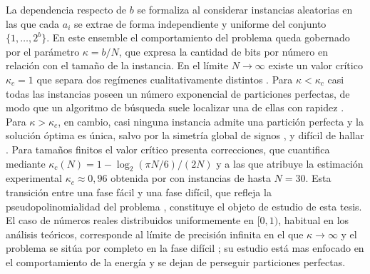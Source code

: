 La dependencia respecto de $b$ se formaliza al considerar instancias aleatorias en las que cada $a_i$ se extrae de forma independiente y uniforme del conjunto $\{1, \ldots, 2^{b}\}$. En este ensemble el comportamiento del problema queda gobernado por el parámetro $\kappa = b/N$, que expresa la cantidad de bits por número en relación con el tamaño de la instancia. En el límite $N \to \infty$ existe un valor crítico $\kappa_c = 1$ que separa dos regímenes cualitativamente distintos \parencite{mertens1998,mertens2001,borgs2001}. Para $\kappa < \kappa_c$ casi todas las instancias poseen un número exponencial de particiones perfectas, de modo que un algoritmo de búsqueda suele localizar una de ellas con rapidez \parencite{mertens1998,mertens2001}. Para $\kappa > \kappa_c$, en cambio, casi ninguna instancia admite una partición perfecta y la solución óptima es única, salvo por la simetría global de signos \parencite{borgs2001}, y difícil de hallar \parencite{mertens1998,mertens2001}. Para tamaños finitos el valor crítico presenta correcciones, que \textcite{mertens1998} cuantifica mediante $\kappa_c(N) = 1 - \log_2(\pi N/6)/(2N)$ y a las que atribuye la estimación experimental $\kappa_c \approx 0{,}96$ obtenida por \textcite{gent1996} con instancias de hasta $N = 30$. Esta transición entre una fase fácil y una fase difícil, que refleja la pseudopolinomialidad del problema \parencite{mertens1998}, constituye el objeto de estudio de esta tesis. El caso de números reales distribuidos uniformemente en $[0,1)$, habitual en los análisis teóricos, corresponde al límite de precisión infinita en el que $\kappa \to \infty$ y el problema se sitúa por completo en la fase difícil \parencite{mertens2001}; su estudio está mas enfocado en el comportamiento de la energía y se dejan de perseguir particiones perfectas.

